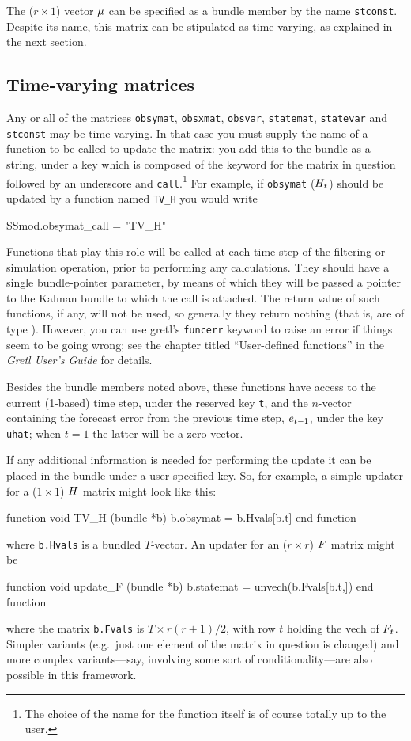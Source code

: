 \documentclass[a4paper]{article}
\begin{document}
The ($r \times 1$) vector $\mu$ can be specified as a bundle
member by the name \texttt{stconst}. Despite its name, this matrix can
be stipulated as time varying, as explained in the next section.

\subsection{Time-varying matrices}
\label{sec:tvarying}

Any or all of the matrices \texttt{obsymat}, \texttt{obsxmat},
\texttt{obsvar}, \texttt{statemat}, \texttt{statevar} and
\texttt{stconst} may be time-varying.  In that case you must supply
the name of a function to be called to update the matrix: you add this
to the bundle as a string, under a key which is composed of the
keyword for the matrix in question followed by an underscore and
\texttt{call}.\footnote{The choice of the name for the function itself
  is of course totally up to the user.} For example, if
\texttt{obsymat} ($H_t$) should be updated by a function named
\texttt{TV\_H} you would write
%
\begin{code}
SSmod.obsymat_call = "TV_H"
\end{code}
%
Functions that play this role will be called at each time-step of the
filtering or simulation operation, prior to performing any
calculations. They should have a single bundle-pointer parameter, by
means of which they will be passed a pointer to the Kalman bundle to
which the call is attached.  The return value of such functions, if
any, will not be used, so generally they return nothing (that is, are
of type ).  However, you can use gretl's \texttt{funcerr}
keyword to raise an error if things seem to be going wrong; see the
chapter titled ``User-defined functions'' in the \textit{Gretl User's
  Guide} for details.

Besides the bundle members noted above, these functions have access to
the current (1-based) time step, under the reserved key
\texttt{t}, and the $n$-vector containing the forecast error from the
previous time step, $e_{t-1}$, under the key \texttt{uhat};
when $t=1$ the latter will be a zero vector.

If any additional information is needed for performing the update it
can be placed in the bundle under a user-specified key.  So, for
example, a simple updater for a ($1 \times 1$) $H$ matrix might
look like this:
%
\begin{code}
function void TV_H (bundle *b)
    b.obsymat = b.Hvals[b.t]
end function
\end{code}
%
where \texttt{b.Hvals} is a bundled $T$-vector. An updater for an
($r \times r$) $F$ matrix might be
%
\begin{code}
function void update_F (bundle *b)
    b.statemat = unvech(b.Fvals[b.t,])
end function
\end{code}
%
where the matrix \texttt{b.Fvals} is $T \times r(r+1)/2$, with row $t$
holding the vech of $F_t$. Simpler variants (e.g.\ just one
element of the matrix in question is changed) and more complex
variants---say, involving some sort of conditionality---are also
possible in this framework.
\end{document}
